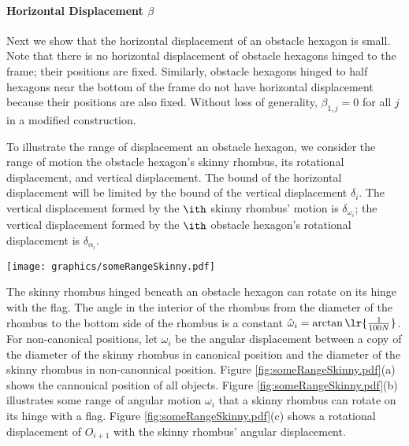 \paragraph{Horizontal Displacement $\beta$}

Next we show that the horizontal displacement of an obstacle hexagon is small.  
Note that there is no horizontal displacement of obstacle hexagons hinged to the frame; their positions are fixed.  
Similarly, obstacle hexagons hinged to half hexagons near the bottom of the frame do not have horizontal displacement because their positions are also fixed.  
Without loss of generality, $\beta_{1,j}=0$ for all $j$ in a modified construction.

To illustrate the range of displacement an obstacle hexagon, we consider the range of motion the obstacle hexagon's skinny rhombus, its rotational displacement, and vertical displacement.  
The bound of the horizontal displacement will be limited by the bound of the vertical displacement $\delta_i$.  
The vertical displacement formed by the $\ith$ skinny rhombus' motion is $\delta_{\omega_i}$; the vertical displacement formed by the $\ith$ obstacle hexagon's rotational displacement is $\delta_{\alpha_i}$.

\begin{minipage}{\linewidth}
\begin{center}
\texttt{[image: graphics/someRangeSkinny.pdf]}
\label{fig:someRangeSkinny.pdf}
\end{center}
\end{minipage}

The skinny rhombus hinged beneath an obstacle hexagon can rotate on its hinge with the flag. 
The angle in the interior of the rhombus from the diameter of the rhombus to the bottom side of the rhombus is a constant $\hat{\omega}_i = \arctan \lr{\frac{1}{100N}}$.  
For non-canonical positions, let $\omega_i$ be the angular displacement between a copy of the diameter of the skinny rhombus in canonical position and the diameter of the skinny rhombus in non-canonnical position.  
Figure \ref{fig:someRangeSkinny.pdf}(a) shows the cannonical position of all objects.  
Figure \ref{fig:someRangeSkinny.pdf}(b) illustrates some range of angular motion $\omega_i$ that a skinny rhombus can rotate on its hinge with a flag.  
Figure \ref{fig:someRangeSkinny.pdf}(c) shows a rotational displacement of $O_{i+1}$ with the skinny rhombus' angular displacement.

